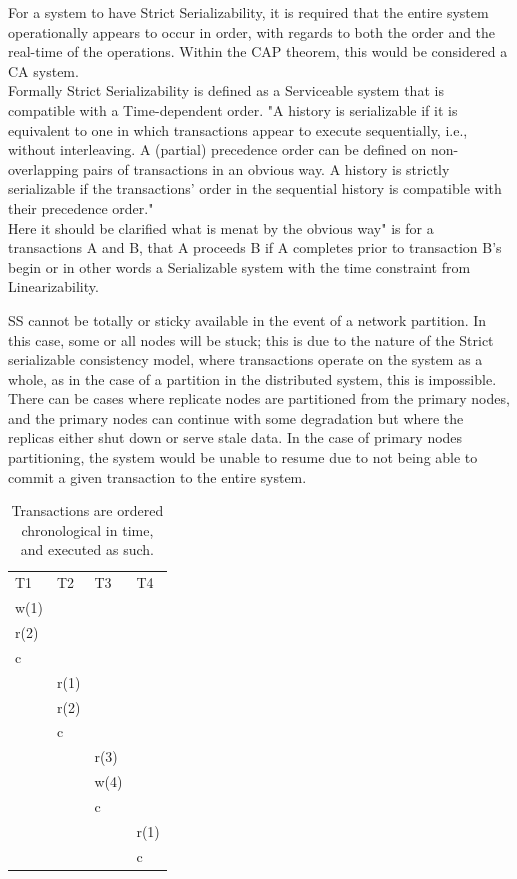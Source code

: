 \documentclass[a4paper,10pt,titlepage]{report}
\begin{document}
    For a system to have Strict Serializability, it is required that the entire system operationally appears to occur in order, with regards to both the order and the real-time of the operations. Within the CAP theorem, this would be considered a CA system.\\
    \vspace{5mm}
    Formally Strict Serializability is defined as a Serviceable system that is compatible with a Time-dependent order.
    "A history is serializable if it is equivalent to one in which transactions appear to execute sequentially, i.e., without interleaving. A (partial) precedence order can be defined on non-overlapping pairs of transactions in an obvious way. A history is strictly serializable if the transactions' order in the sequential history is compatible with their precedence order." \cite{Herlihy1990Linearizability}\\
    \vspace{5mm}
    Here it should be clarified what is menat by the obvious way" is for a transactions A and B, that A proceeds B if A completes prior to transaction B's begin or in other words a Serializable system with the time constraint from Linearizability.

    SS cannot be totally or sticky available in the event of a network partition. In this case, some or all nodes will be stuck; this is due to the nature of the Strict serializable consistency model, where transactions operate on the system as a whole, as in the case of a partition in the distributed system, this is impossible. There can be cases where replicate nodes are partitioned from the primary nodes, and the primary nodes can continue with some degradation but where the replicas either shut down or serve stale data. In the case of primary nodes partitioning, the system would be unable to resume due to not being able to commit a given transaction to the entire system.


    \begin{table}[h]
        \begin{tabular}{l|l|l|l}
            T1   & T2   & T3   & T4   \\
            w(1) &      &      &      \\
            r(2) &      &      &      \\
            c    &      &      &      \\
            & r(1) &      &      \\
            & r(2) &      &      \\
            & c    &      &      \\
            &      & r(3) &      \\
            &      & w(4) &      \\
            &      & c    &      \\
            &      &      & r(1) \\
            &      &      & c
        \end{tabular}
        \caption{Transactions are ordered chronological in time, and executed as such.}

    \end{table}
\end{document}
